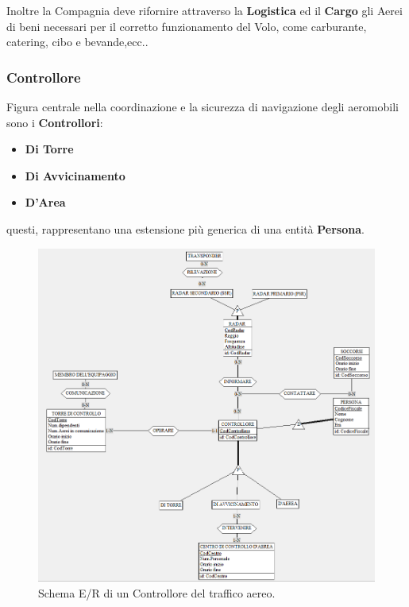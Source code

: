 \textsf{\small Inoltre la Compagnia deve rifornire attraverso la \textbf{Logistica} ed il \textbf{Cargo} gli Aerei di beni necessari per il corretto funzionamento del Volo, come carburante, catering, cibo e bevande,ecc..}\\


\newpage

\enlargethispage{1\linewidth}

\subsubsection{Controllore}

\textsf{\small Figura centrale nella coordinazione e la sicurezza di navigazione degli aeromobili sono i \textbf{Controllori}: }\\
\begin{itemize}
	\item \textbf{\small Di Torre}
	\item \textbf{\small Di Avvicinamento}
	\item \textbf{\small D'Area}
\end{itemize}

\textsf{\small questi, rappresentano una estensione più generica di una entità \textbf{Persona}.}\\

\begin{figure}[H] 
	\centering
	\includegraphics[width=1.2\linewidth, height=1.2\textheight, keepaspectratio]{./img/Schema_Concettuale/Controllore.png}
	\caption{Schema E/R di un Controllore del traffico aereo.}
	\label{fig:schema_controllore}
\end{figure}


